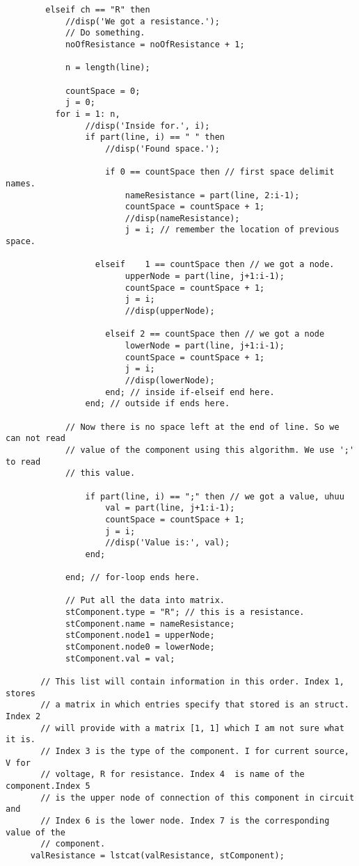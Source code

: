 \documentclass[a4paper,10pt]{article}
\begin{document}
\begin{verbatim}
        elseif ch == "R" then
            //disp('We got a resistance.');
            // Do something.
            noOfResistance = noOfResistance + 1;

            n = length(line);

            countSpace = 0;
            j = 0;
          for i = 1: n,
                //disp('Inside for.', i);
                if part(line, i) == " " then
                    //disp('Found space.');

                    if 0 == countSpace then // first space delimit names.
                        nameResistance = part(line, 2:i-1);
                        countSpace = countSpace + 1;
                        //disp(nameResistance);
                        j = i; // remember the location of previous space.

                  elseif    1 == countSpace then // we got a node.
                        upperNode = part(line, j+1:i-1);
                        countSpace = countSpace + 1;
                        j = i;
                        //disp(upperNode);

                    elseif 2 == countSpace then // we got a node
                        lowerNode = part(line, j+1:i-1);
                        countSpace = countSpace + 1;
                        j = i;
                        //disp(lowerNode);
                    end; // inside if-elseif end here.
                end; // outside if ends here.

            // Now there is no space left at the end of line. So we can not read
            // value of the component using this algorithm. We use ';' to read
            // this value.

                if part(line, i) == ";" then // we got a value, uhuu
                    val = part(line, j+1:i-1);
                    countSpace = countSpace + 1;
                    j = i;
                    //disp('Value is:', val);
                end;

            end; // for-loop ends here.

            // Put all the data into matrix.
            stComponent.type = "R"; // this is a resistance.
            stComponent.name = nameResistance;
            stComponent.node1 = upperNode;
            stComponent.node0 = lowerNode;
            stComponent.val = val;

       // This list will contain information in this order. Index 1, stores
       // a matrix in which entries specify that stored is an struct. Index 2
       // will provide with a matrix [1, 1] which I am not sure what it is.
       // Index 3 is the type of the component. I for current source, V for
       // voltage, R for resistance. Index 4  is name of the component.Index 5
       // is the upper node of connection of this component in circuit and
       // Index 6 is the lower node. Index 7 is the corresponding value of the
       // component.
     valResistance = lstcat(valResistance, stComponent);



\end{verbatim}
\end{document}
